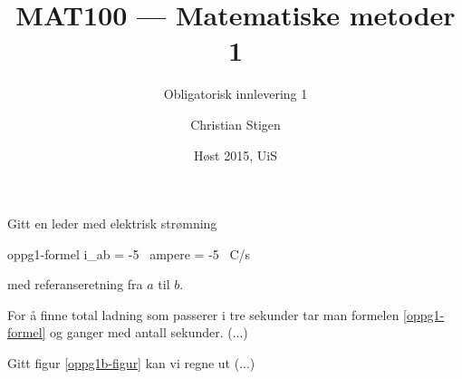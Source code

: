 \documentclass[a4paper,norsk,12pt]{article}
\title{MAT100 --- Matematiske metoder 1}
\subtitle{Obligatorisk innlevering 1}
\author{Christian Stigen}
\date{Høst 2015, UiS}
\begin{document}
  \maketitle

  Gitt en leder med elektrisk strømning

  \begin{formel}{oppg1-formel}
    i_{ab} = -5 \, \textrm{ampere} = -5 \, \textrm{C/s}
  \end{formel}

  med referanseretning fra $a$ til $b$.

  For å finne total ladning som passerer i tre sekunder tar man
  formelen \ref{oppg1-formel} og ganger med antall sekunder. (...)

  Gitt figur \ref{oppg1b-figur} kan vi regne ut (...)
\end{document}
